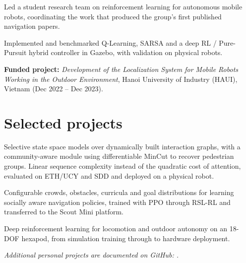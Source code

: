 \documentclass[10pt]{article}
\begin{document}
\begin{achievements}
  \item Led a student research team on reinforcement learning for autonomous
        mobile robots, coordinating the work that produced the group's first
        published navigation papers.
  \item Implemented and benchmarked Q-Learning, SARSA and a deep RL / Pure-Pursuit
        hybrid controller in Gazebo, with validation on physical robots.
\end{achievements}
\begin{detail}
{\fontsize{9}{11.5}\selectfont\textbf{Funded project:} \emph{Development of the
Localization System for Mobile Robots Working in the Outdoor Environment},
Hanoi University of Industry (HAUI), Vietnam (Dec 2022 -- Dec 2023).}
\end{detail}

\section{Selected projects}

\begin{detail}
Selective state space models over dynamically built interaction graphs, with a
community-aware module using differentiable MinCut to recover pedestrian groups.
Linear sequence complexity instead of the quadratic cost of attention, evaluated
on ETH/UCY and SDD and deployed on a physical robot.
\end{detail}

\begin{detail}
Configurable crowds, obstacles, curricula and goal distributions for learning
socially aware navigation policies, trained with PPO through RSL-RL and
transferred to the Scout Mini platform.
\end{detail}

\begin{detail}
Deep reinforcement learning for locomotion and outdoor autonomy on an 18-DOF
hexapod, from simulation training through to hardware deployment.
\end{detail}
\begin{detail}
{\fontsize{9}{11.5}\selectfont\itshape Additional personal projects are documented on GitHub: .}
\end{detail}
\end{document}
